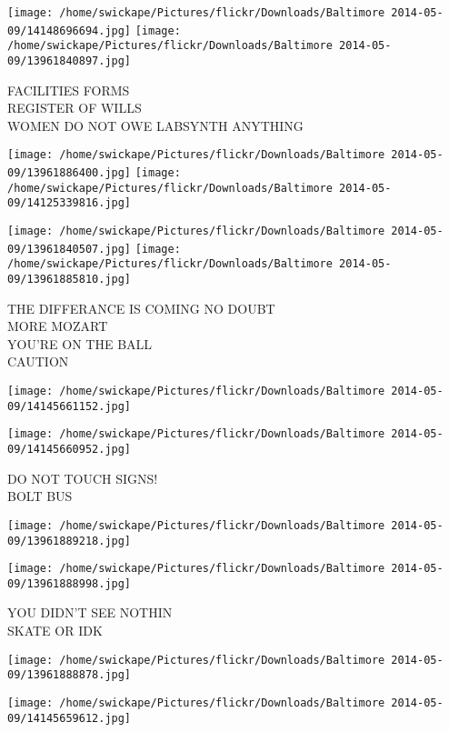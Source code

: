 \documentclass[10pt,letterpaper]{article}
\begin{document}
\vspace{0.25in}
\texttt{[image: /home/swickape/Pictures/flickr/Downloads/Baltimore 2014-05-09/14148696694.jpg]}
\texttt{[image: /home/swickape/Pictures/flickr/Downloads/Baltimore 2014-05-09/13961840897.jpg]}

FACILITIES FORMS\\
REGISTER OF WILLS\\
WOMEN DO NOT OWE LABSYNTH ANYTHING
\pagebreak

\texttt{[image: /home/swickape/Pictures/flickr/Downloads/Baltimore 2014-05-09/13961886400.jpg]}
\texttt{[image: /home/swickape/Pictures/flickr/Downloads/Baltimore 2014-05-09/14125339816.jpg]}

\texttt{[image: /home/swickape/Pictures/flickr/Downloads/Baltimore 2014-05-09/13961840507.jpg]}
\texttt{[image: /home/swickape/Pictures/flickr/Downloads/Baltimore 2014-05-09/13961885810.jpg]}

THE DIFFERANCE IS COMING NO DOUBT\\
MORE MOZART\\
YOU'RE ON THE BALL\\
CAUTION
\pagebreak

\texttt{[image: /home/swickape/Pictures/flickr/Downloads/Baltimore 2014-05-09/14145661152.jpg]}

\vspace{0.25in}
\texttt{[image: /home/swickape/Pictures/flickr/Downloads/Baltimore 2014-05-09/14145660952.jpg]}

DO NOT TOUCH SIGNS!\\
BOLT BUS
\pagebreak

\texttt{[image: /home/swickape/Pictures/flickr/Downloads/Baltimore 2014-05-09/13961889218.jpg]}

\vspace{0.25in}
\texttt{[image: /home/swickape/Pictures/flickr/Downloads/Baltimore 2014-05-09/13961888998.jpg]}

YOU DIDN'T SEE NOTHIN\\
SKATE OR IDK
\pagebreak

\texttt{[image: /home/swickape/Pictures/flickr/Downloads/Baltimore 2014-05-09/13961888878.jpg]}

\vspace{0.25in}
\texttt{[image: /home/swickape/Pictures/flickr/Downloads/Baltimore 2014-05-09/14145659612.jpg]}
\end{document}

